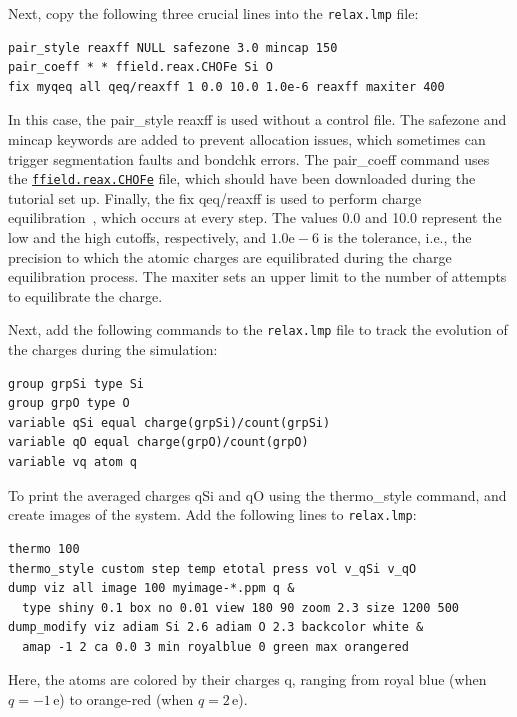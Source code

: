 \documentclass[9pt,tutorial]{livecoms}
\newcommand{\lmpcmd}[1]{\hspace{0pt}\colorbox{listing}{\textcolor{command}{\small{#1}}}\hspace{0pt}} %
\newcommand{\flecmd}[1]{\textcolor{command}{\texttt{#1}}} %
\newcommand{\dwlcmd}[1]{\textcolor{download}{\texttt{#1}}} %
\newcommand{\filepath}{https://raw.githubusercontent.com/lammpstutorials/lammpstutorials-article/main/files/}
\begin{document}
Next, copy the following three crucial lines into the \flecmd{relax.lmp} file:
\begin{lstlisting}
pair_style reaxff NULL safezone 3.0 mincap 150
pair_coeff * * ffield.reax.CHOFe Si O
fix myqeq all qeq/reaxff 1 0.0 10.0 1.0e-6 reaxff maxiter 400
\end{lstlisting}
In this case, the \lmpcmd{pair\_style reaxff} is used without a control file.  The
\lmpcmd{safezone} and \lmpcmd{mincap} keywords are added to prevent
allocation issues, which sometimes can trigger segmentation faults and
\lmpcmd{bondchk} errors.  The \lmpcmd{pair\_coeff} command uses the
\href{\filepath tutorial5/ffield.reax.CHOFe}{\dwlcmd{ffield.reax.CHOFe}}
file, which should have been downloaded during the tutorial set up.  Finally, the
\lmpcmd{fix qeq/reaxff} is used to perform charge equilibration~\cite{rappe1991charge},
which occurs at every step.  The values 0.0 and 10.0 represent the
low and the high cutoffs, respectively, and $1.0 \text{e} -6$ is the
{\color{blue}tolerance, i.e., the precision to which the atomic charges are
equilibrated during the charge equilibration process.}
The \lmpcmd{maxiter} sets an upper limit to the number of attempts to
equilibrate the charge.

Next, add the following commands to the \flecmd{relax.lmp} file to track the
evolution of the charges during the simulation:
\begin{lstlisting}
group grpSi type Si
group grpO type O
variable qSi equal charge(grpSi)/count(grpSi)
variable qO equal charge(grpO)/count(grpO)
variable vq atom q
\end{lstlisting}
To print the averaged charges \lmpcmd{qSi} and \lmpcmd{qO} using the
\lmpcmd{thermo\_style} command, and create images of the system.  Add the
following lines to \flecmd{relax.lmp}:
\begin{lstlisting}
thermo 100
thermo_style custom step temp etotal press vol v_qSi v_qO
dump viz all image 100 myimage-*.ppm q &
  type shiny 0.1 box no 0.01 view 180 90 zoom 2.3 size 1200 500
dump_modify viz adiam Si 2.6 adiam O 2.3 backcolor white &
  amap -1 2 ca 0.0 3 min royalblue 0 green max orangered
\end{lstlisting}
Here, the atoms are colored by their charges \lmpcmd{q}, ranging from royal blue
(when $q=-1\,\text{e}$) to orange-red (when $q=2\,\text{e}$).
\end{document}
